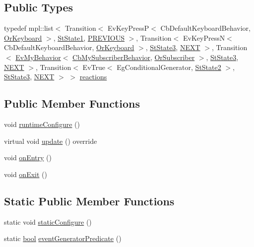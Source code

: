 \subsection*{Public Types}
\begin{DoxyCompactItemize}
\item 
typedef mpl\+::list$<$ Transition$<$ Ev\+Key\+PressP$<$ Cb\+Default\+Keyboard\+Behavior, \hyperlink{classsm__ferrari_1_1OrKeyboard}{Or\+Keyboard} $>$, \hyperlink{structsm__ferrari_1_1StState1}{St\+State1}, \hyperlink{structsm__ferrari_1_1StState2_1_1PREVIOUS}{P\+R\+E\+V\+I\+O\+US} $>$, Transition$<$ Ev\+Key\+PressN$<$ Cb\+Default\+Keyboard\+Behavior, \hyperlink{classsm__ferrari_1_1OrKeyboard}{Or\+Keyboard} $>$, \hyperlink{structsm__ferrari_1_1StState3}{St\+State3}, \hyperlink{structsm__ferrari_1_1StState2_1_1NEXT}{N\+E\+XT} $>$, Transition$<$ \hyperlink{structsm__ferrari_1_1cl__subscriber_1_1EvMyBehavior}{Ev\+My\+Behavior}$<$ \hyperlink{classsm__ferrari_1_1cl__subscriber_1_1CbMySubscriberBehavior}{Cb\+My\+Subscriber\+Behavior}, \hyperlink{classsm__ferrari_1_1OrSubscriber}{Or\+Subscriber} $>$, \hyperlink{structsm__ferrari_1_1StState3}{St\+State3}, \hyperlink{structsm__ferrari_1_1StState2_1_1NEXT}{N\+E\+XT} $>$, Transition$<$ Ev\+True$<$ Eg\+Conditional\+Generator, \hyperlink{structsm__ferrari_1_1StState2}{St\+State2} $>$, \hyperlink{structsm__ferrari_1_1StState3}{St\+State3}, \hyperlink{structsm__ferrari_1_1StState2_1_1NEXT}{N\+E\+XT} $>$ $>$ \hyperlink{structsm__ferrari_1_1StState2_afc456f98dac68c03b15e69f5dff9e682}{reactions}
\end{DoxyCompactItemize}
\subsection*{Public Member Functions}
\begin{DoxyCompactItemize}
\item 
void \hyperlink{structsm__ferrari_1_1StState2_a9bcdeff671e5e19eb07a32bedca1f161}{runtime\+Configure} ()
\item 
virtual void \hyperlink{structsm__ferrari_1_1StState2_a194e5d2ceacdd173fd2f65f13fbc665d}{update} () override
\item 
void \hyperlink{structsm__ferrari_1_1StState2_ad2bd9cb574de21ba35dcd81868a2cf8a}{on\+Entry} ()
\item 
void \hyperlink{structsm__ferrari_1_1StState2_a4b8c24281cf71ebfc54d280886de30ca}{on\+Exit} ()
\end{DoxyCompactItemize}
\subsection*{Static Public Member Functions}
\begin{DoxyCompactItemize}
\item 
static void \hyperlink{structsm__ferrari_1_1StState2_a7767abca55071ed12ae3334b0a720c7c}{static\+Configure} ()
\item 
static \hyperlink{classbool}{bool} \hyperlink{structsm__ferrari_1_1StState2_ad4e53040b66600fdcfafcc1849ac82c7}{event\+Generator\+Predicate} ()
\end{DoxyCompactItemize}
